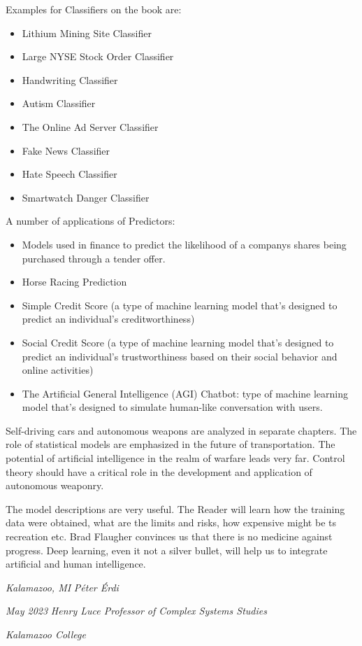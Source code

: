 Examples for Classifiers on the book are:
\begin{itemize}
\item Lithium Mining Site Classifier
\item Large NYSE Stock Order Classifier 
\item Handwriting Classifier 
\item Autism Classifier
\item The Online Ad Server Classifier 
\item Fake News Classifier
\item Hate Speech Classifier
\item Smartwatch Danger Classifier 
\end{itemize}

A number of applications of Predictors:
\begin{itemize}
\item Models used in finance to predict the likelihood of a companys shares being purchased through a tender offer.
\item Horse Racing Prediction
\item Simple Credit Score  (a type of machine learning model that's designed to predict an individual's creditworthiness)
\item Social Credit Score (a type of machine learning model that’s designed to predict an individual’s trustworthiness
based on their social behavior and online activities)
\item The Artificial General Intelligence (AGI) Chatbot: type of machine learning model that’s designed to simulate human-like conversation with users. 
\end{itemize}

Self-driving cars and autonomous weapons are analyzed in separate chapters. The role of statistical models are emphasized in the future of transportation. The potential of artificial intelligence in the realm of warfare leads very far. Control theory should have a critical role in the development and application of autonomous weaponry.

The model descriptions are very useful. The Reader will learn how the training data were obtained, what are the limits and risks, how expensive might be ts recreation etc. Brad Flaugher convinces us that there is no medicine against progress. Deep learning, even it not a silver bullet, will help us to integrate artificial and human intelligence.

\textit{Kalamazoo, MI} \hfill \textit{Péter Érdi}

\textit {May 2023} \hfill \textit{Henry Luce Professor of Complex Systems Studies}

\hfill \textit{Kalamazoo College} 







